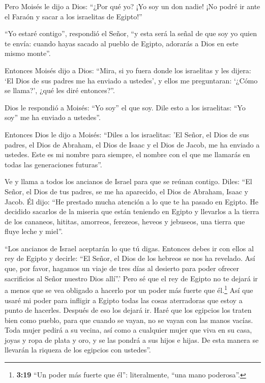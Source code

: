  Pero Moisés le dijo a Dios: ``¿Por qué yo? ¡Yo soy un don
nadie! ¡No podré ir ante el Faraón y sacar a los israelitas de Egipto!''

 ``Yo estaré contigo'', respondió el Señor, ``y esta será
la señal de que soy yo quien te envía: cuando hayas sacado al pueblo de
Egipto, adorarás a Dios en este mismo monte''.

 Entonces Moisés dijo a Dios: ``Mira, si yo fuera donde los
israelitas y les dijera: `El Dios de sus padres me ha enviado a
ustedes', y ellos me preguntaran: `¿Cómo se llama?', ¿qué les diré
entonces?''.

 Dios le respondió a Moisés: ``Yo soy'' el que soy. Dile
esto a los israelitas: ``Yo soy'' me ha enviado a ustedes''.

 Entonces Dios le dijo a Moisés: ``Diles a los israelitas:
'El Señor, el Dios de sus padres, el Dios de Abraham, el Dios de Isaac y
el Dios de Jacob, me ha enviado a ustedes. Este es mi nombre para
siempre, el nombre con el que me llamarás en todas las generaciones
futuras''.

 Ve y llama a todos los ancianos de Israel para que se
reúnan contigo. Diles: ``El Señor, el Dios de tus padres, se me ha
aparecido, el Dios de Abraham, Isaac y Jacob. Él dijo: ``He prestado
mucha atención a lo que te ha pasado en Egipto.  He
decidido sacarlos de la miseria que están teniendo en Egipto y llevarlos
a la tierra de los cananeos, hititas, amorreos, ferezeos, heveos y
jebuseos, una tierra que fluye leche y miel''.

 ``Los ancianos de Israel aceptarán lo que tú digas.
Entonces debes ir con ellos al rey de Egipto y decirle: ``El Señor, el
Dios de los hebreos se nos ha revelado. Así que, por favor, hagamos un
viaje de tres días al desierto para poder ofrecer sacrificios al Señor
nuestro Dios allí''.'  Pero sé que el rey de Egipto no te
dejará ir a menos que se vea obligado a hacerlo por un poder más fuerte
que él.\footnote{\textbf{3:19} ``Un poder más fuerte que él'':
  literalmente, ``una mano poderosa''.}  Así que usaré mi
poder para infligir a Egipto todas las cosas aterradoras que estoy a
punto de hacerles. Después de eso los dejará ir.  Haré que
los egipcios los traten bien como pueblo, para que cuando se vayan, no
se vayan con las manos vacías.  Toda mujer pedirá a su
vecina, así como a cualquier mujer que viva en su casa, joyas y ropa de
plata y oro, y se las pondrá a sus hijos e hijas. De esta manera se
llevarán la riqueza de los egipcios con ustedes''.

